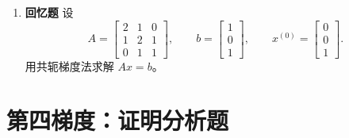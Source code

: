 \documentclass{article}
\newcommand{\oldtag}{\textcolor{red!65!black}{\textbf{回忆题}}}
\begin{document}
\begin{enumerate}
  \item \oldtag{} 设
  \[
    A=\begin{bmatrix}2&1&0\\1&2&1\\0&1&1\end{bmatrix},\qquad
    b=\begin{bmatrix}1\\0\\1\end{bmatrix},\qquad
    x^{(0)}=\begin{bmatrix}0\\0\\1\end{bmatrix}.
  \]
  用共轭梯度法求解 $Ax=b$。
\end{enumerate}

\section{第四梯度：证明分析题}
\end{document}
